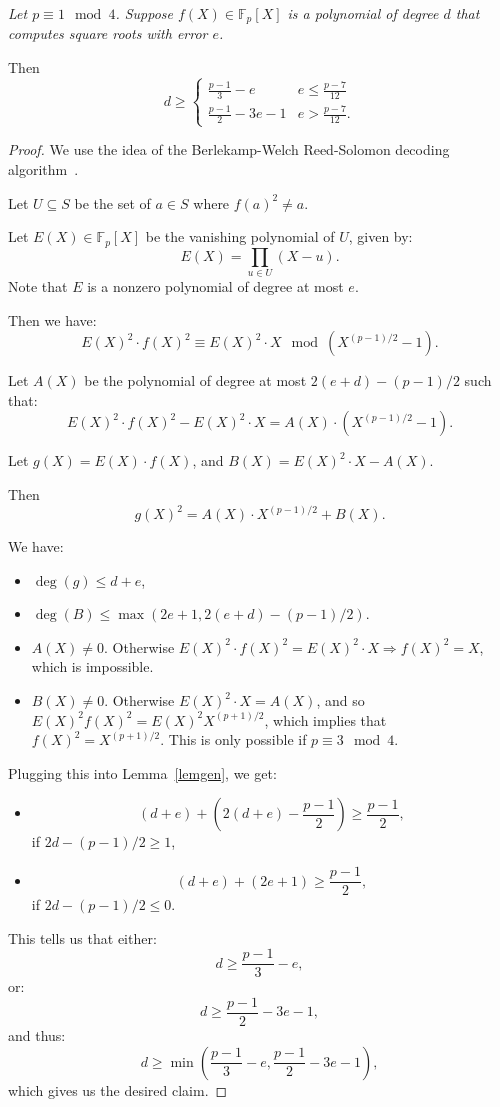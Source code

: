 \documentclass[10pt,a4paper]{article}
\newcommand{\F}{\mathbb{F}}
\begin{document}
{\em Let $p \equiv 1 \mod 4$. Suppose $f(X) \in \F_p[X]$ is a polynomial of degree $d$ that computes square roots with error $e$.

Then
$$ d \geq \begin{cases}
    \frac{p-1}{3}  - e &    e \leq \frac{p-7}{12}\\
    \frac{p-1}{2} - 3e - 1 &  e > \frac{p-7}{12}.
          \end{cases}
$$}
\begin{proof}
 We use the idea of the Berlekamp-Welch Reed-Solomon decoding algorithm~\cite{BerlekampWelch}.
 
 Let $U \subseteq S$ be the set of $a \in S$ where $f(a)^2 \neq a$.
 
 Let $E(X) \in \F_p[X]$ be the vanishing polynomial of $U$, given by:
 $$E(X) = \prod_{u \in U} (X - u).$$
 Note that $E$ is a nonzero polynomial of degree at most $e$.
 
 Then we have:
 $$ E(X)^2 \cdot f(X)^2  \equiv  E(X)^2 \cdot X \mod (X^{(p-1)/2} - 1).$$
 
 Let $A(X)$ be the polynomial of degree at most $2(e+d)-(p-1)/2$ such that:
 $$ E(X)^2 \cdot f(X)^2 - E(X)^2 \cdot X = A(X) \cdot (X^{(p-1)/2} - 1).$$ 
 
 Let $g(X) = E(X) \cdot f(X)$, and $B(X) = E(X)^2 \cdot X - A(X)$.
 
 Then
 $$g(X)^2 = A(X) \cdot X^{(p-1)/2}  +  B(X).$$
 
 We have:
 \begin{itemize}
  \item $\deg(g) \leq d+e$,
  \item $\deg(B) \leq \max(2e+1, 2(e+d) - (p-1)/2)$.
  \item $A(X) \neq 0$. Otherwise $E(X)^2 \cdot f(X)^2 = E(X)^2 \cdot X \Longrightarrow f(X)^2 = X$, which is impossible.
  \item $B(X) \neq 0$. Otherwise $E(X)^2 \cdot X = A(X)$, and so 
  $E(X)^2 f(X)^2 =  E(X)^2 X^{(p+1)/2}$, which implies that $f(X)^2 = X^{(p+1)/2}$. This is only possible if $p \equiv 3 \mod 4$.
 \end{itemize}
 Plugging this into Lemma~\ref{lemgen}, we get:
 \begin{itemize}
  \item  $$(d+e) + \left(2(d+e) - \frac{p-1}{2}\right) \geq \frac{p-1}{2},$$
  if $2d - (p-1)/2 \geq 1$,
  \item $$ (d+e) + (2e +1) \geq \frac{p-1}{2},$$
  if $2d - (p-1)/2 \leq 0$.
 \end{itemize}

 This tells us that either:
 $$ d \geq \frac{p-1}{3} - e,$$
 or:
 $$ d \geq \frac{p-1}{2} - 3e - 1,$$
 and thus:
 $$ d \geq \min\left( \frac{p-1}{3} - e, \frac{p-1}{2} - 3e-1 \right),$$
 which gives us the desired claim.
\end{proof}
\end{document}
